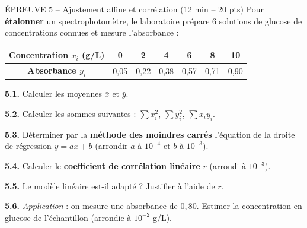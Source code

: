 \documentclass[11pt,a4paper]{article}
\begin{document}
\newpage

\begin{epreuve}{ÉPREUVE 5 -- Ajustement affine et corrélation \hfill \small (12 min -- 20 pts)}
Pour \textbf{étalonner} un spectrophotomètre, le laboratoire prépare 6 solutions de glucose de concentrations connues et mesure l'absorbance :

\vspace{0.2cm}
\begin{center}
\renewcommand{\arraystretch}{1.3}
\begin{tabular}{|c|c|c|c|c|c|c|}
\hline
\textbf{Concentration $x_i$ (g/L)} & 0 & 2 & 4 & 6 & 8 & 10 \\
\hline
\textbf{Absorbance $y_i$} & 0{,}05 & 0{,}22 & 0{,}38 & 0{,}57 & 0{,}71 & 0{,}90 \\
\hline
\end{tabular}
\end{center}

\vspace{0.2cm}
\textbf{5.1.} Calculer les moyennes $\bar{x}$ et $\bar{y}$.

\vspace{0.2cm}
\textbf{5.2.} Calculer les sommes suivantes :
$\displaystyle\sum x_i^2$, $\displaystyle\sum y_i^2$, $\displaystyle\sum x_i y_i$.

\vspace{0.2cm}
\textbf{5.3.} Déterminer par la \textbf{méthode des moindres carrés} l'équation de la droite de régression $y = ax + b$ (arrondir $a$ à $10^{-4}$ et $b$ à $10^{-3}$).

\vspace{0.2cm}
\textbf{5.4.} Calculer le \textbf{coefficient de corrélation linéaire} $r$ (arrondi à $10^{-3}$).

\vspace{0.2cm}
\textbf{5.5.} Le modèle linéaire est-il adapté ? Justifier à l'aide de $r$.

\vspace{0.2cm}
\textbf{5.6.} \emph{Application} : on mesure une absorbance de $0{,}80$. Estimer la concentration en glucose de l'échantillon (arrondie à $10^{-2}$ g/L).
\end{epreuve}

\vspace{0.3cm}
\end{document}
